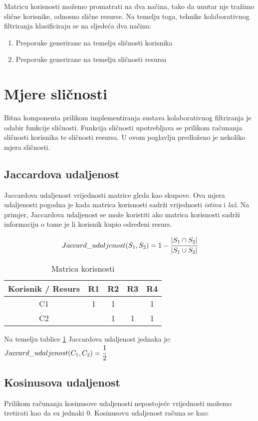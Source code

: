 \documentclass[times, utf8, seminar]{fer}
\begin{document}
Matricu korisnosti možemo promatrati na dva načina, tako da unutar nje tražimo slične korisnike, odnosno slične resurse. Na temelju toga, tehnike kolaborativnog filtriranja klasificiraju se na sljedeća dva načina:
\begin{enumerate}
	\item Preporuke generirane na temelju sličnosti korisnika
	\item Preporuke generirane na temelju sličnosti resursa
\end{enumerate}

\section{Mjere sličnosti}
Bitna komponenta prilikom implementiranja sustava kolaborativnog filtriranja je odabir funkcije sličnosti. Funkcija sličnosti upotrebljava se prilikom računanja sličnosti korisnika te sličnosti resursa. U ovom poglavlju predloženo je nekoliko mjera sličnosti.

\subsection{Jaccardova udaljenost}
Jaccardova udaljenost vrijednosti matrice gleda kao skupove. Ova mjera udaljenosti pogodna je kada matrica korisnosti sadrži vrijednosti \textit{istina} i \textit{laž}. Na primjer, Jaccardova udaljenost se može koristiti ako matrica korisnosti sadrži informaciju o tome je li korisnik kupio određeni resurs. 

\begin{equation}
	Jaccard\_udaljenost(S_1, S_2) = 1 - \cfrac{|S_1 \cap S_2|}{|S_1 \cup S_2|}
\end{equation}

\begin{table}[htb]
	\caption{Matrica korisnosti }
	\label{tbl:utility_matrix2}
	\centering
		\begin{tabular}{|c|c|c|c|c|} 
		\hline
		 Korisnik / Resurs & R1 & R2 & R3 & R4 \\ 
		\hline
		C1 & 1 & 1 & & 1  \\
		C2 &  & 1 & 1 & 1 \\ 
		\hline
		\end{tabular}
\end{table}

Na temelju tablice \ref{tbl:utility_matrix2} Jaccardova udaljenost jednaka je: $Jaccard\_udaljenost(C_1, C_2) = \cfrac{1}{2}$

\subsection{Kosinusova udaljenost}
Prilikom računanja kosinusove udaljenosti nepostojeće vrijednosti možemo tretirati kao da su jednaki $0$. Kosinusovu udaljenost računa se kao:
\end{document}
